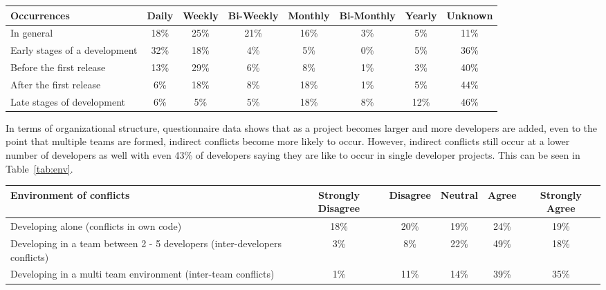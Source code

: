 \documentclass[conference]{IEEEtran}
\begin{document}
\begin{table*}[tb!]
\begin{center}
\begin{tabular}{| p{7cm} | c | c | c | c | c | c | c |}
\hline
Occurrences & Daily & Weekly & Bi-Weekly & Monthly & Bi-Monthly & Yearly & Unknown \\
\hline
\hline
In general & 18\% & 25\% & 21\% & 16\% & 3\% & 5\% & 11\% \\ \hline
Early stages of a development & 32\% & 18\% & 4\% & 5\% & 0\% & 5\% & 36\% \\ \hline
Before the first release & 13\% & 29\% & 6\% & 8\% & 1\% & 3\% & 40\% \\ \hline
After the first release & 6\% & 18\% & 8\% & 18\% & 1\% & 5\% & 44\% \\ \hline
Late stages of development & 6\% & 5\% & 5\% & 18\% & 8\% & 12\% & 46\% \\ \hline
\end{tabular}
\end{center}
\caption{Results of questionnaire as to how often indirect conflicts occur, in terms of percentage
of questionnaire participants.\label{tab:often}}
\end{table*}

In terms of organizational structure, questionnaire data shows that as a project becomes larger and more
developers are added, even to the point that multiple teams are formed, indirect conflicts become more likely to
occur. However, indirect conflicts still occur at a lower number of developers as well with even 43\% of developers
saying they are like to occur in single developer projects. This can be seen in Table~\ref{tab:env}.

\begin{table*}[tb!]
\begin{center}
\begin{tabular}{| p{7cm} | c | c | c | c | c |}
\hline
Environment of conflicts & Strongly Disagree & Disagree & Neutral & Agree & Strongly Agree \\
\hline
\hline
Developing alone (conflicts in own code) & 18\% & 20\% & 19\% & 24\% & 19\% \\ \hline
Developing in a team between 2 - 5 developers (inter-developers conflicts) & 3\% & 8\% & 22\% & 49\% & 18\% \\ \hline
Developing in a multi team environment (inter-team conflicts) & 1\% & 11\% & 14\% & 39\% & 35\% \\ \hline
\end{tabular}
\end{center}
\caption{Questionnaire results about development environments in which indirect conflicts are likely to occur, in terms of percentage
of questionnaire participants.\label{tab:env}}
\end{table*}
\end{document}
